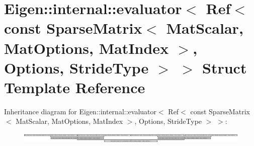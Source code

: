 \hypertarget{struct_eigen_1_1internal_1_1evaluator_3_01_ref_3_01const_01_sparse_matrix_3_01_mat_scalar_00_01_17d98bf798af280639e961c8a27d545c}{}\section{Eigen\+:\+:internal\+:\+:evaluator$<$ Ref$<$ const Sparse\+Matrix$<$ Mat\+Scalar, Mat\+Options, Mat\+Index $>$, Options, Stride\+Type $>$ $>$ Struct Template Reference}
\label{struct_eigen_1_1internal_1_1evaluator_3_01_ref_3_01const_01_sparse_matrix_3_01_mat_scalar_00_01_17d98bf798af280639e961c8a27d545c}
Inheritance diagram for Eigen\+:\+:internal\+:\+:evaluator$<$ Ref$<$ const Sparse\+Matrix$<$ Mat\+Scalar, Mat\+Options, Mat\+Index $>$, Options, Stride\+Type $>$ $>$\+:\begin{figure}[H]
\begin{center}
\leavevmode
\includegraphics[height=0.480000cm]{struct_eigen_1_1internal_1_1evaluator_3_01_ref_3_01const_01_sparse_matrix_3_01_mat_scalar_00_01_17d98bf798af280639e961c8a27d545c}
\end{center}
\end{figure}
